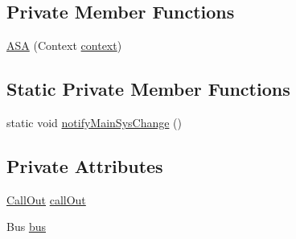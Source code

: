 \subsection*{Private Member Functions}
\begin{DoxyCompactItemize}
\item 
\hyperlink{classpt_1_1lsts_1_1asa_1_1ASA_a60a8551e0d2c3897887ff8e560b937ab}{A\+S\+A} (Context \hyperlink{classpt_1_1lsts_1_1asa_1_1ASA_ad16e2c7db27b0a63a471c62f1fdcc1df}{context})
\end{DoxyCompactItemize}
\subsection*{Static Private Member Functions}
\begin{DoxyCompactItemize}
\item 
static void \hyperlink{classpt_1_1lsts_1_1asa_1_1ASA_acfece516fe24da0385e93f531766671c}{notify\+Main\+Sys\+Change} ()
\end{DoxyCompactItemize}
\subsection*{Private Attributes}
\begin{DoxyCompactItemize}
\item 
\hyperlink{classpt_1_1lsts_1_1asa_1_1feedback_1_1CallOut}{Call\+Out} \hyperlink{classpt_1_1lsts_1_1asa_1_1ASA_aedf7af794060d789656aa41a10649684}{call\+Out}
\item 
Bus \hyperlink{classpt_1_1lsts_1_1asa_1_1ASA_a3b1468022b12779c73e5d8bb41e39f8e}{bus}
\end{DoxyCompactItemize}
